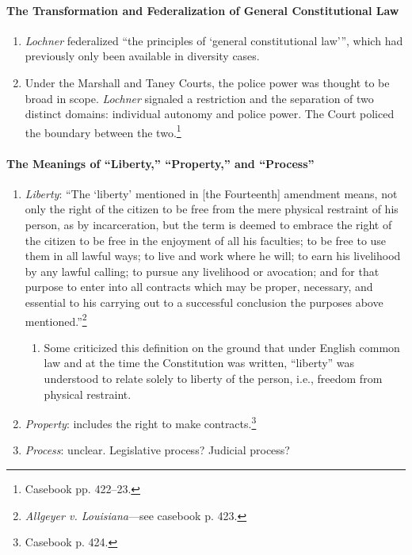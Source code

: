\paragraph{The Transformation and Federalization of General Constitutional Law}

\begin{enumerate}
    \item \emph{Lochner} federalized \enquote{the principles of 
    \enquote{general constitutional law}}, which had previously only been 
    available in diversity cases.
    \item Under the Marshall and Taney Courts, the police power was thought to 
    be broad in scope. \emph{Lochner} signaled a restriction and the 
    separation of two distinct domains: individual autonomy and police 
    power. The Court policed the boundary between the two.\footnote{Casebook 
    pp. 422--23.}
\end{enumerate}

\paragraph{The Meanings of ``Liberty,'' ``Property,'' and ``Process''}

\begin{enumerate}
    \item \emph{Liberty}: ``The `liberty' mentioned in [the Fourteenth] 
    amendment means, not only the right of the citizen to be free from the 
    mere physical restraint of his person, as by incarceration, but the term 
    is deemed to embrace the right of the citizen to be free in the enjoyment 
    of all his faculties; to be free to use them in all lawful ways; to live 
    and work where he will; to earn his livelihood by any lawful calling; to 
    pursue any livelihood or avocation; and for that purpose to enter into all 
    contracts which may be proper, necessary, and essential to his carrying 
    out to a successful conclusion the purposes above 
    mentioned.''\footnote{\emph{Allgeyer v. Louisiana}---see casebook p. 423.}
    \begin{enumerate}
        \item Some criticized this definition on the ground that under English 
        common law and at the time the Constitution was written, ``liberty'' 
        was understood to relate solely to liberty of the person, i.e., 
        freedom from physical restraint.
    \end{enumerate}
    \item \emph{Property}: includes the right to make 
    contracts.\footnote{Casebook p. 424.}
    \item \emph{Process}: unclear. Legislative process? Judicial process?
\end{enumerate}

